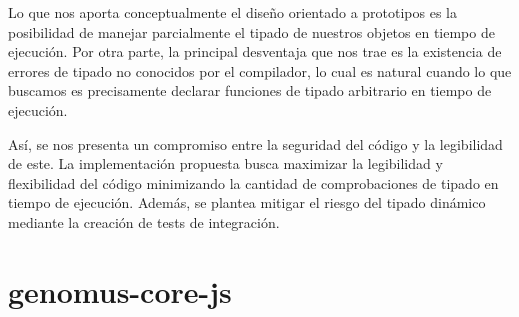 Lo que nos aporta conceptualmente el diseño orientado a prototipos es la posibilidad de manejar parcialmente el tipado de nuestros objetos en tiempo de ejecución. Por otra parte, la principal desventaja que nos trae es la existencia de errores de tipado no conocidos por el compilador, lo cual es natural cuando lo que buscamos es precisamente declarar funciones de tipado arbitrario en tiempo de ejecución.

Así, se nos presenta un compromiso entre la seguridad del código y la legibilidad de este. La implementación propuesta busca maximizar la legibilidad y flexibilidad del código minimizando la cantidad de comprobaciones de tipado en tiempo de ejecución. Además, se plantea mitigar el riesgo del tipado dinámico mediante la creación de tests de integración.

\section{genomus-core-js}
